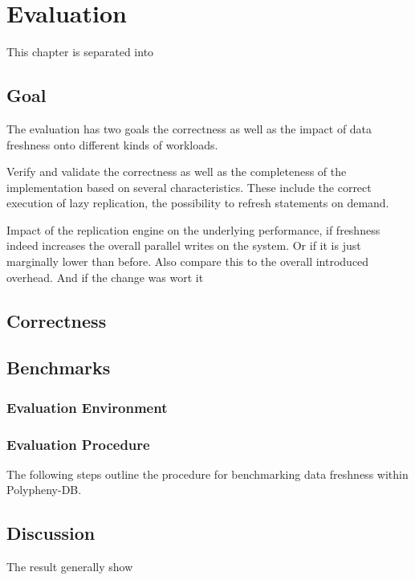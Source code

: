 \chapter{Evaluation}
\label{c:evaluation}

This chapter is separated into 

\section{Goal}
The evaluation has two goals the correctness as well as the impact of data freshness onto different kinds of workloads.

Verify and validate the correctness as well as the completeness of the implementation based on several characteristics.
These include the correct execution of lazy replication, the possibility to refresh statements on demand.

Impact of the replication engine on the underlying performance, if freshness indeed increases the overall parallel writes on the system.
Or if it is just marginally lower than before. Also compare this to the overall introduced overhead. And if the change was wort it

\section{Correctness}

\section{Benchmarks}


\subsection{Evaluation Environment}


\subsection{Evaluation Procedure}
The following steps outline the procedure for benchmarking data freshness within Polypheny-DB.





\section{Discussion}
\label{sec:discussion}
The result generally show